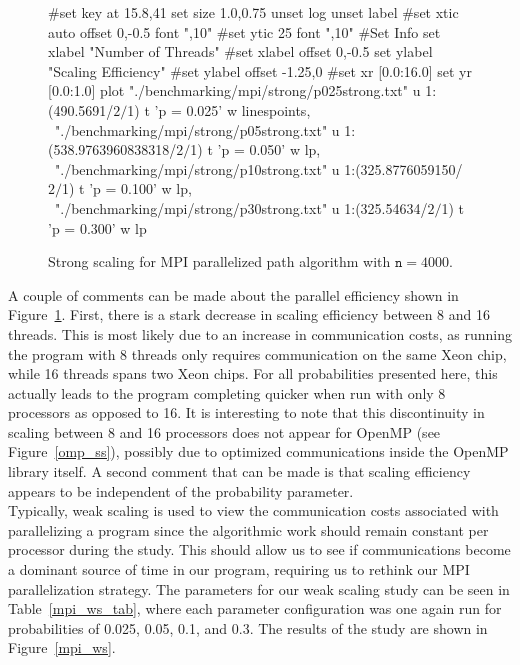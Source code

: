 \documentclass[11pt]{article}
\begin{document}
\begin{figure}[h]
	\begin{center}
		\begin{gnuplot}[terminal=cairolatex, terminaloptions= color] 
			#set key at 15.8,41
			set size 1.0,0.75              
			unset log                          
			unset label                          
			#set xtic auto offset 0,-0.5 font ",10"                     
			#set ytic 25 font ",10" 
			#Set Info
			set xlabel "Number of Threads"
			#set xlabel offset 0,-0.5
			set ylabel "Scaling Efficiency"
			#set ylabel offset -1.25,0
			#set xr [0.0:16.0]
			set yr [0.0:1.0]
			plot "./benchmarking/mpi/strong/p025strong.txt" u 1:(490.5691/$2/$1) t 'p = 0.025' w linespoints, \
			"./benchmarking/mpi/strong/p05strong.txt" u 1:(538.9763960838318/$2/$1) t 'p = 0.050' w lp, \
			"./benchmarking/mpi/strong/p10strong.txt" u 1:(325.8776059150/$2/$1) t 'p = 0.100' w lp, \
			"./benchmarking/mpi/strong/p30strong.txt" u 1:(325.54634/$2/$1) t 'p = 0.300' w lp
		\end{gnuplot}
		\caption{Strong scaling for MPI parallelized path algorithm with $\mathtt{n} = 4000$.}
		\label{mpi_ss}
	\end{center}
\end{figure}
\noindent A couple of comments can be made about the parallel efficiency shown in Figure~\ref{mpi_ss}. First, there is a stark decrease in scaling efficiency between 8 and 16 threads. This is most likely due to an increase in communication costs, as running the program with 8 threads only requires communication on the same Xeon chip, while 16 threads spans two Xeon chips. For all probabilities presented here, this actually leads to the program completing quicker when run with only 8 processors as opposed to 16. It is interesting to note that this discontinuity in scaling between 8 and 16 processors does not appear for OpenMP (see Figure~\ref{omp_ss}), possibly due to optimized communications inside the OpenMP library itself. A second comment that can be made is that scaling efficiency appears to be independent of the probability parameter. \\

\noindent Typically, weak scaling is used to view the communication costs associated with parallelizing a program since the algorithmic work should remain constant per processor during the study. This should allow us to see if communications become a dominant source of time in our program, requiring us to rethink our MPI parallelization strategy. The parameters for our weak scaling study can be seen in Table~\ref{mpi_ws_tab}, where each parameter configuration was one again run for probabilities of 0.025, 0.05, 0.1, and 0.3. The results of the study are shown in Figure~\ref{mpi_ws}.\\
\end{document}

